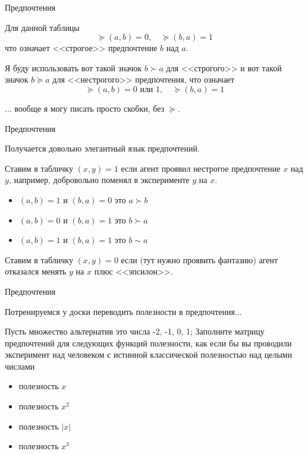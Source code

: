 \documentclass{beamer}
\begin{document}
\begin{frame}{Предпочтения}

Для данной таблицы $$\succcurlyeq(a,b) = 0, \quad \succcurlyeq(b,a) = 1$$ что означает <<строгое>> предпочтение $b$ над $a$. 

Я буду использовать вот такой значок $b \succ a$ для <<строгого>> и вот такой значок $b \succcurlyeq a$ для <<нестрогого>> предпочтения, что означает
$$\succcurlyeq(a,b) = 0 \text{ или } 1, \quad \succcurlyeq(b,a) = 1$$

... вообще я могу писать просто скобки, без $\succcurlyeq$.

\end{frame}

\begin{frame}{Предпочтения}

Получается довольно элегантный язык предпочтений. 

Ставим в табличку $(x,y) = 1$ если агент проявил нестрогое предпочтение $x$ над $y$, например, добровольно поменял в эксперименте $y$ на $x$.

\begin{itemize}
	\item $(a,b) = 1$ и $(b,a) = 0$ это $a \succ b$
	\item $(a,b) = 0$ и $(b,a) = 1$ это $b \succ a$
	\item $(a,b) = 1$ и $(b,a) = 1$ это $b \sim a$
\end{itemize}

Ставим в табличку $(x,y) = 0$ если (тут нужно проявить фантазию) агент отказался менять $y$ на $x$ плюс <<эпсилон>>.

\end{frame}

\begin{frame}{Предпочтения}

Потренируемся у доски переводить полезности в предпочтения...

Пусть множество альтернатив это числа -2, -1, 0, 1; Заполните матрицу предпочтений для следующих функций полезности, как если бы вы проводили эксперимент над человеком с истинной классической полезностью над целыми числами

\begin{itemize}
\item полезность $x$
\item полезность $x^2$
\item полезность $|x|$
\item полезность $x^3$	
\end{itemize}

\end{frame}
\end{document}
